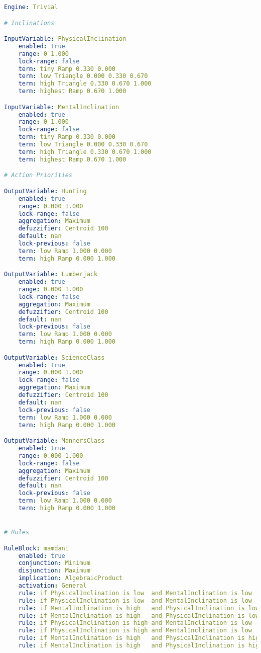 \documentclass[11pt, a4paper]{article}
\begin{document}
	\begin{lstlisting}[language=yaml]
Engine: Trivial

# Inclinations

InputVariable: PhysicalInclination
	enabled: true
	range: 0 1.000
	lock-range: false
	term: tiny Ramp 0.330 0.000 
	term: low Triangle 0.000 0.330 0.670
	term: high Triangle 0.330 0.670 1.000
	term: highest Ramp 0.670 1.000

InputVariable: MentalInclination
	enabled: true
	range: 0 1.000
	lock-range: false
	term: tiny Ramp 0.330 0.000 
	term: low Triangle 0.000 0.330 0.670
	term: high Triangle 0.330 0.670 1.000
	term: highest Ramp 0.670 1.000

# Action Priorities

OutputVariable: Hunting
	enabled: true
	range: 0.000 1.000
	lock-range: false
	aggregation: Maximum
	defuzzifier: Centroid 100
	default: nan
	lock-previous: false
	term: low Ramp 1.000 0.000
	term: high Ramp 0.000 1.000

OutputVariable: Lumberjack
	enabled: true
	range: 0.000 1.000
	lock-range: false
	aggregation: Maximum
	defuzzifier: Centroid 100
	default: nan
	lock-previous: false
	term: low Ramp 1.000 0.000
	term: high Ramp 0.000 1.000

OutputVariable: ScienceClass
	enabled: true
	range: 0.000 1.000
	lock-range: false
	aggregation: Maximum
	defuzzifier: Centroid 100
	default: nan
	lock-previous: false
	term: low Ramp 1.000 0.000
	term: high Ramp 0.000 1.000

OutputVariable: MannersClass
	enabled: true
	range: 0.000 1.000
	lock-range: false
	aggregation: Maximum
	defuzzifier: Centroid 100
	default: nan
	lock-previous: false
	term: low Ramp 1.000 0.000
	term: high Ramp 0.000 1.000


# Rules

RuleBlock: mamdani
	enabled: true
	conjunction: Minimum
	disjunction: Maximum
	implication: AlgebraicProduct
	activation: General
	rule: if PhysicalInclination is low  and MentalInclination is low    then MannersClass is high
	rule: if PhysicalInclination is low  and MentalInclination is low    then Hunting is low
	rule: if MentalInclination is high   and PhysicalInclination is low  then ScienceClass is high
	rule: if MentalInclination is high   and PhysicalInclination is low  then Lumberjack is low
	rule: if PhysicalInclination is high and MentalInclination is low    then Lumberjack is high
	rule: if PhysicalInclination is high and MentalInclination is low    then ScienceClass is low
	rule: if MentalInclination is high   and PhysicalInclination is high then Hunting is high
	rule: if MentalInclination is high   and PhysicalInclination is high then MannersClass is low
	\end{lstlisting}
	
\end{document}
